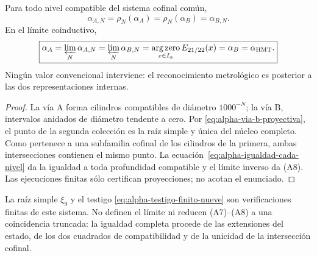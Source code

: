 \begin{theorem}
\label{prop:alpha-dos-limites-historico-rev04}
Para todo nivel compatible del sistema cofinal común,
\begingroup
\renewcommand{\theequation}{A7}
\begin{equation}
 \boxed{\alpha_{A,N}=\rho_N(\alpha_A)
 =\rho_N(\alpha_B)=\alpha_{B,N}.}
 \label{eq:alpha-dos-vias-cada-nivel-historico-rev04}
\end{equation}
\endgroup
En el límite coinductivo,
\begingroup
\renewcommand{\theequation}{A8}
\begin{equation}
 \boxed{\alpha_A
 =\varprojlim_N\alpha_{A,N}
 =\varprojlim_N\alpha_{B,N}
 =\operatorname*{arg\,zero}_{x\in I_\alpha}E_{21/22}(x)
 =\alpha_B=\alpha_{\mathrm{HMT}}.}
 \label{eq:alpha-dos-vias-limite-coinductivo-historico-rev04}
\end{equation}
\endgroup
Ningún valor convencional interviene: el reconocimiento metrológico es
posterior a las dos representaciones internas.
\end{theorem}

\begin{proof}
La vía A forma cilindros compatibles de diámetro \(1000^{-N}\); la vía B,
intervalos anidados de diámetro tendente a cero. Por
\eqref{eq:alpha-via-b-proyectiva}, el punto de la segunda colección es la raíz
simple y única del núcleo completo. Como pertenece a una subfamilia cofinal
de los cilindros de la primera, ambas intersecciones contienen el mismo punto.
La ecuación~\eqref{eq:alpha-igualdad-cada-nivel} da la igualdad a toda
profundidad compatible y el límite inverso da (A8). Las ejecuciones finitas
sólo certifican proyecciones; no acotan el enunciado.
\end{proof}

La raíz simple \(\xi_9\) y el testigo
\eqref{eq:alpha-testigo-finito-nueve} son verificaciones finitas de este
sistema. No definen el límite ni reducen (A7)--(A8) a una coincidencia
truncada: la igualdad completa procede de las extensiones del estado, de los
dos cuadrados de compatibilidad y de la unicidad de la intersección cofinal.
